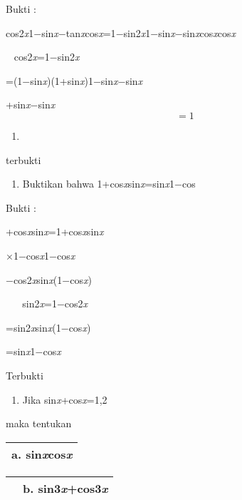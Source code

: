 \documentclass[11pt,fleqn]{book} %
\begin{document}
\begin{myEnumerate}
\begin{itemize}
\noindent Bukti : 

\noindent cos2\textit{x}1$\mathrm{-}$sin\textit{x}$\mathrm{-}$tan\textit{x}cos\textit{x}=1$\mathrm{-}$sin2\textit{x}1$\mathrm{-}$sin\textit{x}$\mathrm{-}$sin\textit{x}cos\textit{x}cos\textit{x}

\noindent ~ cos2\textit{x}=1$\mathrm{-}$sin2\textit{x}

\noindent =(1$\mathrm{-}$sin\textit{x})(1+sin\textit{x})1$\mathrm{-}$sin\textit{x}$\mathrm{-}$sin\textit{x}

+sin\textit{x}$\mathrm{-}$sin\textit{x}
\[=1\] 

\begin{enumerate}
\item  ~ ~ 
\end{enumerate}

\noindent terbukti

\begin{enumerate}
\item  Buktikan bahwa 1+cos\textit{x}sin\textit{x}=sin\textit{x}1$\mathrm{-}$cos
\end{enumerate}

\noindent Bukti : 

+cos\textit{x}sin\textit{x}=1+cos\textit{x}sin\textit{x}

\noindent $\times$1$\mathrm{-}$cos\textit{x}1$\mathrm{-}$cos\textit{x}

$\mathrm{-}$cos2\textit{x}sin\textit{x}(1$\mathrm{-}$cos\textit{x})

\noindent ~ ~ sin2\textit{x}=1$\mathrm{-}$cos2\textit{x}

\noindent =sin2\textit{x}sin\textit{x}(1$\mathrm{-}$cos\textit{x})

\noindent =sin\textit{x}1$\mathrm{-}$cos\textit{x}

\noindent Terbukti 

\begin{enumerate}
\item  Jika sin\textit{x}+cos\textit{x}=1,2
\end{enumerate}

\noindent maka tentukan 

\begin{tabular}{|p{0.5in}|} \hline 
a. sin\textit{x}cos\textit{x} \\ \hline 
\end{tabular}



\begin{tabular}{|p{0.0in}|p{0.7in}|} \hline 
 & b. sin3\textit{x}+cos3\textit{x} \\ \hline 
\end{tabular}




\end{itemize}
\end{myEnumerate}
\end{document}
